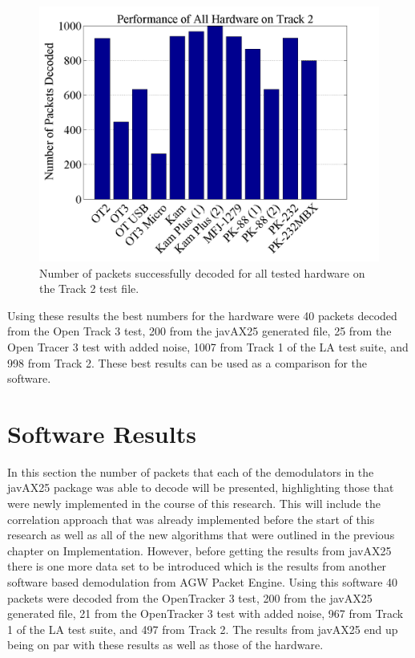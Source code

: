  \begin{figure}
  \centering
	\includegraphics[width=0.75\linewidth]{images/PerformanceofAllHardwareonTrack2.png} 
	\caption{Number of packets successfully decoded for all tested hardware on the Track 2 test file.}
   \label{allHardwareTrack2}
\end{figure}

Using these results the best numbers for the hardware were 40 packets decoded from the Open Track 3 test, 200 from the javAX25 generated file, 25 from the Open Tracer 3 test with added noise, 1007 from Track 1 of the LA test suite, and 998 from Track 2. These best results can be used as a comparison for the software.

\section{Software Results}
In this section the number of packets that each of the demodulators in the javAX25 package was able to decode will be presented, highlighting those that were newly implemented in the course of this research. This will include the correlation approach that was already implemented before the start of this research as well as all of the new algorithms that were outlined in the previous chapter on Implementation. However, before getting the results from javAX25 there is one more data set to be introduced which is the results from another software based demodulation from AGW Packet Engine. Using this software 40 packets were decoded from the OpenTracker 3 test, 200 from the javAX25 generated file, 21 from the OpenTracker 3 test with added noise, 967 from Track 1 of the LA test suite, and 497 from Track 2. The results from javAX25 end up being on par with these results as well as those of the hardware.

